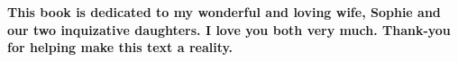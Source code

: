 
\vspace*{\fill}
\begin{center}
\textbf{This book is dedicated to my wonderful and loving wife, Sophie and our two inquizative daughters. I love you both very much. Thank-you for helping make this text a reality.}
\end{center}
\vspace*{\fill}\clearpage %

